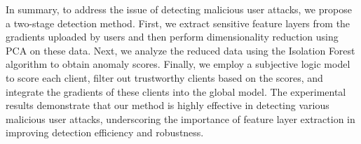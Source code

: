 \documentclass[conference]{IEEEtran}
\begin{document}
In summary, to address the issue of detecting malicious user attacks, we propose a two-stage detection method. First, we extract sensitive feature layers from the gradients uploaded by users and then perform dimensionality reduction using PCA on these data. Next, we analyze the reduced data using the Isolation Forest algorithm to obtain anomaly scores. Finally, we employ a subjective logic model to score each client, filter out trustworthy clients based on the scores, and integrate the gradients of these clients into the global model. The experimental results demonstrate that our method is highly effective in detecting various malicious user attacks, underscoring the importance of feature layer extraction in improving detection efficiency and robustness.



\end{document}
